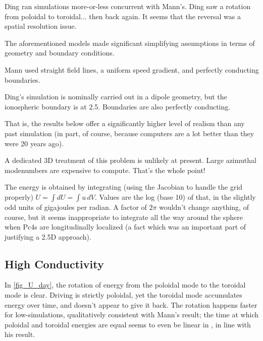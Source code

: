 
Ding\cite{ding_1995} ran simulations more-or-less concurrent with Mann's. Ding saw a rotation from poloidal to toroidal... then back again. It seems that the reversal was a spatial resolution issue. 

The aforementioned models made significant simplifying assumptions in terms of geometry and boundary conditions. 

Mann used straight field lines, a uniform \Alfven speed gradient, and perfectly conducting boundaries. 

Ding's simulation is nominally carried out in a dipole geometry, but the ionospheric boundary is at \SI{2.5}{\RE}. Boundaries are also perfectly conducting. 

That is, the results below offer a significantly higher level of realism than any past simulation (in part, of course, because computers are a lot better than they were 20 years ago). 

A dedicated 3D treatment of this problem is unlikely at present. Large azimuthal modenumbers are expensive to compute. That's the whole point! 

The energy is obtained by integrating (using the Jacobian to handle the grid properly) $U = \int dU = \int u \, dV$. Values are the log (base 10) of that, in the slightly odd units of gigajoules per radian. A factor of $2\pi$ wouldn't change anything, of course, but it seems inappropriate to integrate all the way around the sphere when Pc4s are longitudinally localized (a fact which was an important part of justifying a 2.5D approach). 

\subsection{High Conductivity}

In \cref{fig_U_day}, the rotation of energy from the poloidal mode to the toroidal mode is clear. Driving is strictly poloidal, yet the toroidal mode accumulates energy over time, and doesn't appear to give it back. The rotation happens faster for low-\azm simulations, qualitatively consistent with Mann's result; the time at which poloidal and toroidal energies are equal seems to even be linear in \azm, in line with his result. 

